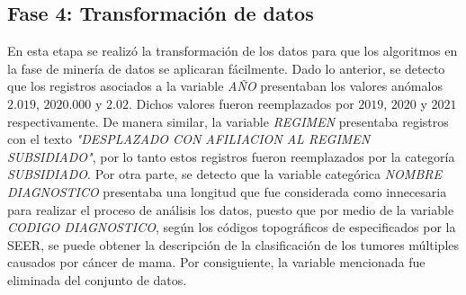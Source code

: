 \subsection*{Fase 4: Transformación de datos}
En esta etapa se realizó la transformación de los datos para que los algoritmos en la fase de minería de datos se aplicaran fácilmente. Dado lo anterior, se detecto que los registros asociados a la variable \textit{AÑO} presentaban los valores anómalos $2.019$, $2020.000$ y  $2.02$. Dichos valores fueron reemplazados por $2019$, $2020$ y $2021$ respectivamente. De manera similar, la variable \textit{REGIMEN} presentaba registros con el texto \textit{"DESPLAZADO CON AFILIACION AL REGIMEN SUBSIDIADO"}, por lo tanto estos registros fueron reemplazados por la categoría \textit{SUBSIDIADO}. Por otra parte, se detecto que la variable categórica \textit{NOMBRE DIAGNOSTICO} presentaba una longitud que fue considerada como innecesaria para realizar el proceso de análisis los datos, puesto que por medio de la variable \textit{CODIGO DIAGNOSTICO}, según los códigos topográficos de especificados por la SEER, se puede obtener la descripción de la clasificación de los tumores múltiples causados por cáncer de mama. Por consiguiente, la variable mencionada fue eliminada del conjunto de datos. 
